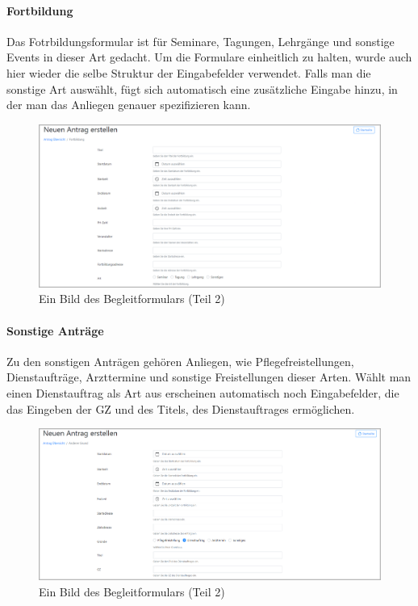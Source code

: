 \paragraph{Fortbildung}
Das Fotrbildungsformular ist für Seminare, Tagungen, Lehrgänge und sonstige Events in dieser Art gedacht. Um die Formulare einheitlich zu halten, wurde auch hier wieder die selbe Struktur der Eingabefelder verwendet. Falls man die sonstige Art auswählt, fügt sich automatisch eine zusätzliche Eingabe hinzu, in der man das Anliegen genauer spezifizieren kann.
\begin{figure}[H]
	\centering
	\includegraphics[width=1\linewidth]{images/website/fortbildung_1}
	\caption[Neuer Schulantrag]{Ein Bild des Begleitformulars (Teil 2)}
	\label{fig:frotbildung}
\end{figure}

\paragraph{Sonstige Anträge}
Zu den sonstigen Anträgen gehören Anliegen, wie Pflegefreistellungen, Dienstaufträge, Arzttermine und sonstige Freistellungen dieser Arten. Wählt man einen Dienstauftrag als Art aus erscheinen automatisch noch Eingabefelder, die das Eingeben der GZ und des Titels, des Dienstauftrages ermöglichen.
\begin{figure}[H]
	\centering
	\includegraphics[width=1\linewidth]{images/website/dienstauftrag}
	\caption[Neuer Schulantrag]{Ein Bild des Begleitformulars (Teil 2)}
	\label{fig:dienst}
\end{figure}

